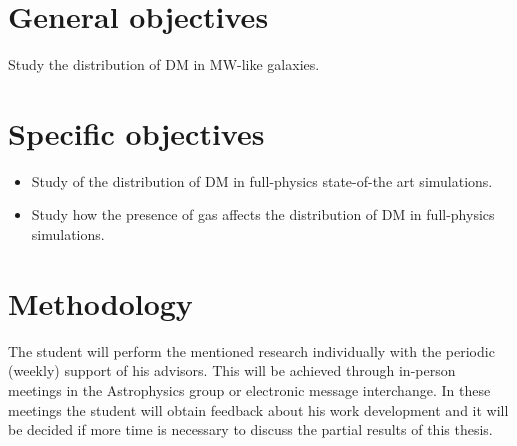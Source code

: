 \documentclass[12pt]{article}
\begin{document}
\section{General objectives}


Study the distribution of DM in MW-like galaxies.

\section{Specific objectives}


\begin{itemize}
	\item Study of the distribution of DM in full-physics state-of-the art simulations.

	\item Study how the presence of gas affects the distribution of DM in full-physics simulations.
	
\end{itemize}

\section{Methodology}




The student will perform the mentioned research individually with the periodic (weekly) support of his advisors. This will be achieved through in-person meetings in the Astrophysics group or electronic message interchange. 
In these meetings the student will obtain feedback about his work development and it will be decided if more time is necessary to discuss the partial results of this thesis. \\
\end{document}
